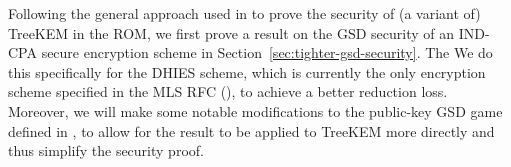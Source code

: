 Following the general approach used in \cite{ttkem} to prove the security of (a variant of) TreeKEM in the ROM, we first prove a result on the GSD security of an IND-CPA secure encryption scheme in Section~\vref{sec:tighter-gsd-security}. The  We do this specifically for the DHIES scheme, which is currently the only encryption scheme specified in the MLS RFC (\cite{rfc9420}), to achieve a better reduction loss. Moreover, we will make some notable modifications to the public-key GSD game defined in \cite{ttkem}, to allow for the result to be applied to TreeKEM more directly and thus simplify the security proof.
